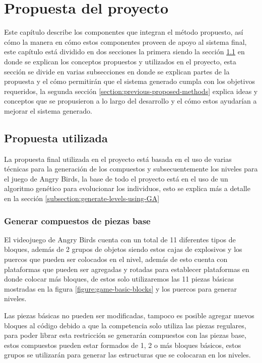 \chapter{Propuesta del proyecto}
\label{chapter:proposed-method}

Este capítulo describe los componentes que integran el método propuesto, así
cómo la manera en cómo estos componentes proveen de apoyo al sistema final, este
capítulo está dividido en dos secciones la primera siendo la sección
\ref{section:used-method} en donde se explican los conceptos propuestos y
utilizados en el proyecto, esta sección se divide en varias subsecciones en
donde se explican partes de la propuesta y el cómo permitirán que el sistema
generado cumpla con los objetivos requeridos, la segunda sección
\ref{section:previous-proposed-methods} explica ideas y conceptos que se
propusieron a lo largo del desarrollo y el cómo estos ayudarían a mejorar el
sistema generado.

\section{Propuesta utilizada}
\label{section:used-method}

La propuesta final utilizada en el proyecto está basada en el uso de varias
técnicas para la generación de los compuestos y subsecuentemente los niveles
para el juego de Angry Birds, la base de todo el proyecto está en el uso de un
algoritmo genético para evolucionar los individuos, esto se explica más a
detalle en la sección \ref{subsection:generate-levels-using-GA}

\subsection{Generar compuestos de piezas base}
\label{subsection:generate-composites}

El videojuego de Angry Birds cuenta con un total de 11 diferentes tipos de
bloques, además de 2 grupos de objetos siendo estos cajas de explosivos y los
puercos que pueden ser colocados en el nivel, además de esto cuenta con
plataformas que pueden ser agregadas y rotadas para establecer plataformas en
donde colocar más bloques, de estos solo utilizaremos las 11 piezas básicas
mostradas en la figura \ref{figure:game-basic-blocks} y los puercos para generar
niveles.

Las piezas básicas no pueden ser modificadas, tampoco es posible agregar nuevos
bloques al código debido a que la competencia solo utiliza las piezas regulares,
para poder librar esta restricción se generarán compuestos con las piezas base,
estos compuestos pueden estar formados de 1, 2 o más bloques básicos, estos
grupos se utilizarán para generar las estructuras que se colocaran en los niveles.

